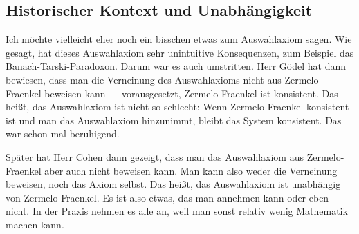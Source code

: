 \begin{math-stroke}
\end{math-stroke}

\begin{ai-global-state-checkpoint-invisible-content}
\end{ai-global-state-checkpoint-invisible-content}

\subsection{Historischer Kontext und Unabhängigkeit}

\begin{spoken-clean}[01:04:40 - 01:06:40]
Ich möchte vielleicht eher noch ein bisschen etwas zum Auswahlaxiom sagen. Wie gesagt, hat dieses Auswahlaxiom sehr unintuitive Konsequenzen, zum Beispiel das Banach-Tarski-Paradoxon. Darum war es auch umstritten. Herr Gödel hat dann bewiesen, dass man die Verneinung des Auswahlaxioms nicht aus Zermelo-Fraenkel beweisen kann --- vorausgesetzt, Zermelo-Fraenkel ist konsistent. Das heißt, das Auswahlaxiom ist nicht so schlecht: Wenn Zermelo-Fraenkel konsistent ist und man das Auswahlaxiom hinzunimmt, bleibt das System konsistent. Das war schon mal beruhigend.

Später hat Herr Cohen dann gezeigt, dass man das Auswahlaxiom aus Zermelo-Fraenkel aber auch nicht beweisen kann. Man kann also weder die Verneinung beweisen, noch das Axiom selbst. Das heißt, das Auswahlaxiom ist unabhängig von Zermelo-Fraenkel. Es ist also etwas, das man annehmen kann oder eben nicht. In der Praxis nehmen es alle an, weil man sonst relativ wenig Mathematik machen kann.
\end{spoken-clean}

